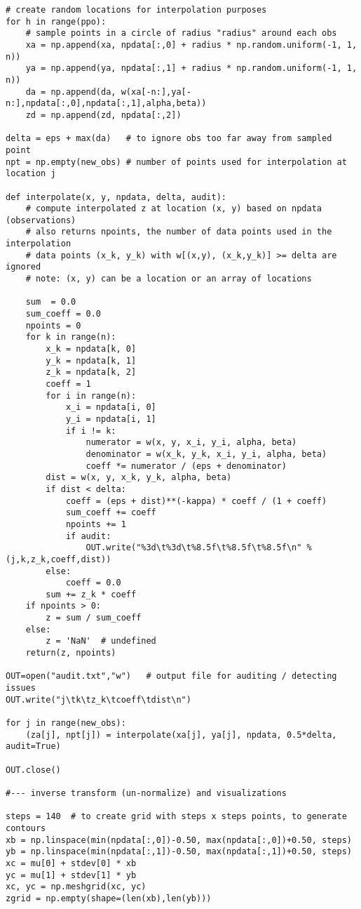 \documentclass[oneside,10pt]{book}
\begin{document}
\begin{lstlisting}
# create random locations for interpolation purposes
for h in range(ppo):
    # sample points in a circle of radius "radius" around each obs
    xa = np.append(xa, npdata[:,0] + radius * np.random.uniform(-1, 1, n))
    ya = np.append(ya, npdata[:,1] + radius * np.random.uniform(-1, 1, n))
    da = np.append(da, w(xa[-n:],ya[-n:],npdata[:,0],npdata[:,1],alpha,beta))
    zd = np.append(zd, npdata[:,2])

delta = eps + max(da)   # to ignore obs too far away from sampled point
npt = np.empty(new_obs) # number of points used for interpolation at location j

def interpolate(x, y, npdata, delta, audit):
    # compute interpolated z at location (x, y) based on npdata (observations)
    # also returns npoints, the number of data points used in the interpolation
    # data points (x_k, y_k) with w[(x,y), (x_k,y_k)] >= delta are ignored
    # note: (x, y) can be a location or an array of locations

    sum  = 0.0
    sum_coeff = 0.0
    npoints = 0
    for k in range(n):
        x_k = npdata[k, 0]
        y_k = npdata[k, 1]
        z_k = npdata[k, 2]
        coeff = 1
        for i in range(n):
            x_i = npdata[i, 0]
            y_i = npdata[i, 1]
            if i != k:
                numerator = w(x, y, x_i, y_i, alpha, beta)
                denominator = w(x_k, y_k, x_i, y_i, alpha, beta)
                coeff *= numerator / (eps + denominator)
        dist = w(x, y, x_k, y_k, alpha, beta)
        if dist < delta:
            coeff = (eps + dist)**(-kappa) * coeff / (1 + coeff)
            sum_coeff += coeff
            npoints += 1
            if audit:
                OUT.write("%3d\t%3d\t%8.5f\t%8.5f\t%8.5f\n" % (j,k,z_k,coeff,dist))
        else:
            coeff = 0.0
        sum += z_k * coeff
    if npoints > 0:
        z = sum / sum_coeff
    else:
        z = 'NaN'  # undefined
    return(z, npoints)

OUT=open("audit.txt","w")   # output file for auditing / detecting issues
OUT.write("j\tk\tz_k\tcoeff\tdist\n")

for j in range(new_obs):
    (za[j], npt[j]) = interpolate(xa[j], ya[j], npdata, 0.5*delta, audit=True)

OUT.close()

#--- inverse transform (un-normalize) and visualizations

steps = 140  # to create grid with steps x steps points, to generate contours
xb = np.linspace(min(npdata[:,0])-0.50, max(npdata[:,0])+0.50, steps)
yb = np.linspace(min(npdata[:,1])-0.50, max(npdata[:,1])+0.50, steps)
xc = mu[0] + stdev[0] * xb
yc = mu[1] + stdev[1] * yb
xc, yc = np.meshgrid(xc, yc)
zgrid = np.empty(shape=(len(xb),len(yb)))


\end{lstlisting}
\end{document}
